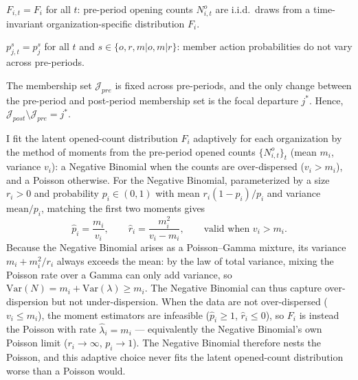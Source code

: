 \documentclass[source/paper/main.tex]{subfiles}
\begin{document}
\begin{assumption}
\label{asm:time-invariant}
$F_{i,t} = F_i$ for all $t$: pre-period opening counts $N_{i,t}^o$ are i.i.d.\ draws from a time-invariant organization-specific distribution $F_i$.
\end{assumption}

\begin{assumption}
\label{asm:stationary}
$p_{j,t}^s = p_j^s$ for all $t$ and $s \in \{o,r,m|o,m|r\}$: member action probabilities do not vary across pre-periods.
\end{assumption}

\begin{assumption}
\label{asm:fixed-membership}
The membership set $\mathcal{J}_{pre}$ is fixed across pre-periods, and the only change between the pre-period and post-period membership set is the focal departure $j^*$.
Hence, $\mathcal{J}_{post} \setminus \mathcal{J}_{pre} = j^*$.
\end{assumption}

I fit the latent opened-count distribution $F_i$ adaptively for each organization by the method of moments from the pre-period opened counts $\{N_{i,t}^o\}_{t}$ (mean $m_i$, variance $v_i$): a Negative Binomial when the counts are over-dispersed ($v_i > m_i$), and a Poisson otherwise.
For the Negative Binomial, parameterized by a size $r_i>0$ and probability $p_i\in(0,1)$ with mean $r_i(1-p_i)/p_i$ and variance $\mathrm{mean}/p_i$, matching the first two moments gives
$$\hat{p}_i = \frac{m_i}{v_i}, \qquad \hat{r}_i = \frac{m_i^2}{v_i-m_i}, \qquad \text{valid when } v_i > m_i.$$
Because the Negative Binomial arises as a Poisson--Gamma mixture, its variance $m_i + m_i^2/r_i$ always exceeds the mean: by the law of total variance, mixing the Poisson rate over a Gamma can only add variance, so $\mathrm{Var}(N) = m_i + \mathrm{Var}(\lambda) \ge m_i$.
The Negative Binomial can thus capture over-dispersion but not under-dispersion.
When the data are not over-dispersed ($v_i \le m_i$), the moment estimators are infeasible ($\hat{p}_i \ge 1$, $\hat{r}_i \le 0$), so $F_i$ is instead the Poisson with rate $\hat{\lambda}_i = m_i$ --- equivalently the Negative Binomial's own Poisson limit ($r_i \to \infty$, $p_i \to 1$).
The Negative Binomial therefore nests the Poisson, and this adaptive choice never fits the latent opened-count distribution worse than a Poisson would.
\end{document}
